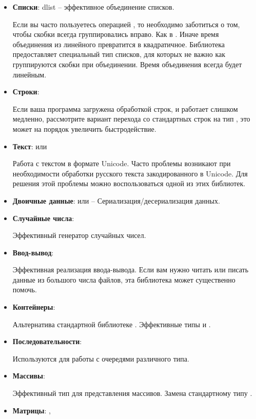 
\begin{itemize}
\item \textbf{Списки}: {dlist} -- эффективное объединение списков.

            Если вы часто пользуетесь операцией \In{++},
            то необходимо заботиться о том, чтобы скобки
            всегда группировались вправо. Как в .
            Иначе время объединения из линейного превратится
            в квадратичное. Библиотека  предоставляет
            специальный тип списков, для которых не важно как 
            группируются скобки при объединении. Время 
            объединения всегда будет линейным. 

\item \textbf{Строки}: 
    
    Если ваша программа загружена обработкой строк,
    и работает слишком медленно, рассмотрите вариант
    перехода со стандартных строк на тип ,
    это может на порядок увеличить быстродействие.

\item \textbf{Текст}:  или  

    Работа с текстом в формате Unicode. Часто проблемы 
    возникают при необходимости обработки русского текста
    закодированного в Unicode. Для решения этой проблемы 
    можно воспользоваться одной из этих библиотек.

\item \textbf{Двоичные данные}:  
        или  -- Сериализация/десериализация данных.

\item \textbf{Случайные числа}: 

    Эффективный генератор случайных чисел.

\item \textbf{Ввод-вывод}: 

    Эффективная реализация ввода-вывода. Если вам нужно читать 
    или писать данные из большого числа файлов, эта библиотека 
    может существенно помочь.

\item \textbf{Контейнеры}: 

    Альтернатива стандартной библиотеке . 
    Эффективные типы  и .  

\item \textbf{Последовательности}: 

    Используются для работы с очередями различного типа.

\item \textbf{Массивы}: 

    Эффективный тип для представления массивов. Замена
    стандартному типу .

\item \textbf{Матрицы}: , 

\end{itemize}

